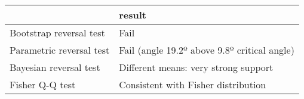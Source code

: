 \begin{tabular}{ll}
\toprule
{} &                                        result \\
\midrule
Bootstrap reversal test  &                                          Fail \\
Parametric reversal test &  Fail (angle 19.2º above 9.8º critical angle) \\
Bayesian reversal test   &          Different means: very strong support \\
Fisher Q-Q test          &           Consistent with Fisher distribution \\
\bottomrule
\end{tabular}
